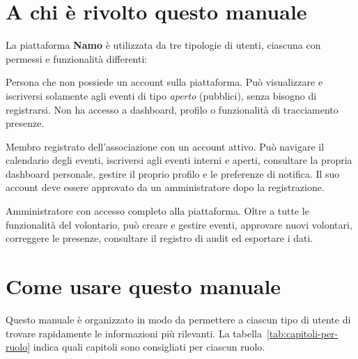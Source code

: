 \documentclass[a4paper,11pt,oneside]{book}
\newcommand{\namo}{\textbf{Namo}}
\newcommand{\ruolo}[1]{\textsc{#1}}
\begin{document}
\section{A chi \`e rivolto questo manuale}
\label{sec:a-chi-rivolto}

La piattaforma \namo{} \`e utilizzata da tre tipologie di utenti, ciascuna con permessi e funzionalit\`a differenti:

\begin{description}[leftmargin=1.5em, labelwidth=4cm, style=nextline]
  \item[\ruolo{Utente Esterno}]
    Persona che non possiede un account sulla piattaforma. Pu\`o visualizzare e iscriversi solamente agli eventi di tipo \textit{aperto} (pubblici), senza bisogno di registrarsi. Non ha accesso a dashboard, profilo o funzionalit\`a di tracciamento presenze.

  \item[\ruolo{Volontario}]
    Membro registrato dell'associazione con un account attivo. Pu\`o navigare il calendario degli eventi, iscriversi agli eventi interni e aperti, consultare la propria dashboard personale, gestire il proprio profilo e le preferenze di notifica. Il suo account deve essere approvato da un amministratore dopo la registrazione.

  \item[\ruolo{Super Admin}]
    Amministratore con accesso completo alla piattaforma. Oltre a tutte le funzionalit\`a del volontario, pu\`o creare e gestire eventi, approvare nuovi volontari, correggere le presenze, consultare il registro di audit ed esportare i dati.
\end{description}

\section{Come usare questo manuale}
\label{sec:come-usare-manuale}

Questo manuale \`e organizzato in modo da permettere a ciascun tipo di utente di trovare rapidamente le informazioni pi\`u rilevanti. La tabella~\ref{tab:capitoli-per-ruolo} indica quali capitoli sono consigliati per ciascun ruolo.
\end{document}
